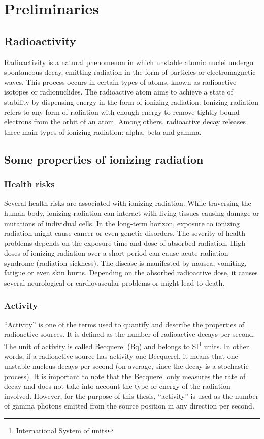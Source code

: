 
\chapter{Preliminaries\label{chap:preliminaries}}

\section{Radioactivity}
Radioactivity is a natural phenomenon in which unstable atomic nuclei undergo spontaneous decay, emitting radiation in the form of particles or electromagnetic waves. 
This process occurs in certain types of atoms, known as radioactive isotopes or radionuclides. 
The radioactive atom aims to achieve a state of stability by dispensing energy in the form of ionizing radiation.
Ionizing radiation refers to any form of radiation with enough energy to remove tightly bound electrons from the orbit of an atom.
Among others, radioactive decay releases three main types of ionizing radiation: alpha, beta and gamma. 

\section{Some properties of ionizing radiation}

\subsection{Health risks}%
Several health risks are associated with ionizing radiation.
While traversing the human body, ionizing radiation can interact with living tissues causing damage or mutations of individual cells.
In the long-term horizon, exposure to ionizing radiation might cause cancer or even genetic disorders.
The severity of health problems depends on the exposure time and dose of absorbed radiation.
High doses of ionizing radiation over a short period can cause acute radiation syndrome (radiation sickness).
The disease is manifested by nausea, vomiting, fatigue or even skin burns. 
Depending on the absorbed radioactive dose, it causes several neurological or cardiovascular problems or might lead to death.%

\subsection{Activity}%
``Activity'' is one of the terms used to quantify and describe the properties of radioactive sources.
It is defined as the number of radioactive decays per second.
The unit of activity is called Becquerel ($\si{\becquerel}$) and belongs to SI\footnote{International System of units} units.
In other words, if a radioactive source has activity one Becquerel, it means that one unstable nucleus decays per second (on average, since the decay is a stochastic process).
It is important to note that the Becquerel only measures the rate of decay and does not take into account the type or energy of the radiation involved.%
However, for the purpose of this thesis, ``activity''  is used as the number of gamma photons emitted from the source position in any direction per second.

